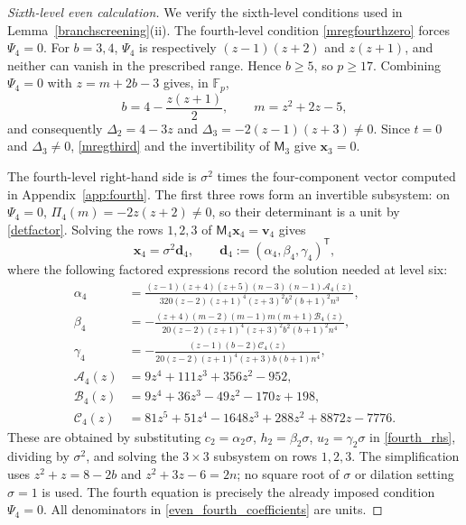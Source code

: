\documentclass[12pt]{article}
\theoremstyle{remark}
\newcommand{\F}{\mathbb{F}_p}
\begin{document}
\begin{proof}[Sixth-level even calculation]
We verify the sixth-level conditions used in
Lemma~\ref{branchscreening}(ii).  The fourth-level condition \eqref{mregfourthzero} forces $\Psi_4=0$.
For $b=3,4$, $\Psi_4$ is respectively $(z-1)(z+2)$ and $z(z+1)$,
and neither can vanish in the prescribed range.  Hence $b\ge5$,
so $p\ge17$.  Combining $\Psi_4=0$ with $z=m+2b-3$ gives, in $\F$,
\begin{equation}\label{q4curve}
 b=4-\frac{z(z+1)}2,\qquad m=z^2+2z-5,
\end{equation}
and consequently $\Delta_2=4-3z$ and
$\Delta_3=-2(z-1)(z+3)\ne0$.  Since $t=0$ and $\Delta_3\ne0$, \eqref{mregthird} and the invertibility
of $\mathsf M_3$ give $\mathbf x_3=0$.

The fourth-level right-hand side is $\sigma^2$ times the
four-component vector computed in Appendix~\ref{app:fourth}.  The first
three rows form an invertible subsystem: on $\Psi_4=0$,
$\Pi_4(m)=-2z(z+2)\ne0$, so their determinant is a unit by \eqref{detfactor}.
Solving the rows $1,2,3$ of $\mathsf M_4\mathbf x_4=\mathbf v_4$ gives
\begin{equation}\label{even_fourth_state}
 \mathbf x_4=\sigma^2\mathbf d_4,\qquad
 \mathbf d_4:=(\alpha_4,\beta_4,\gamma_4)^{\mathsf T},
\end{equation}
where the following factored expressions record the solution needed
at level six:
\begin{equation}\label{even_fourth_coefficients}
\begin{aligned}
 \alpha_4&=
 \frac{(z-1)(z+4)(z+5)(n-3)(n-1)\mathcal A_4(z)}
 {320(z-2)(z+1)^4(z+3)^2b^2(b+1)^2n^3},\\
 \beta_4&=-
 \frac{(z+4)(m-2)(m-1)m(m+1)\mathcal B_4(z)}
 {20(z-2)(z+1)^4(z+3)^2b^2(b+1)^2n^4},\\
 \gamma_4&=-
 \frac{(z-1)(b-2)\mathcal C_4(z)}
 {20(z-2)(z+1)^4(z+3)b(b+1)n^4},\\
 \mathcal A_4(z)&=9z^4+111z^3+356z^2-952,\\
 \mathcal B_4(z)&=9z^4+36z^3-49z^2-170z+198,\\
 \mathcal C_4(z)&=81z^5+51z^4-1648z^3+288z^2+8872z-7776.
\end{aligned}
\end{equation}
These are obtained by substituting
$c_2=\alpha_2\sigma$, $h_2=\beta_2\sigma$, $u_2=\gamma_2\sigma$
in \eqref{fourth_rhs}, dividing by $\sigma^2$, and solving the $3\times3$ subsystem on rows $1,2,3$.
The simplification uses $z^2+z=8-2b$ and $z^2+3z-6=2n$;
no square root of $\sigma$ or dilation setting $\sigma=1$ is used.
The fourth equation is precisely the already imposed condition $\Psi_4=0$.
All denominators in \eqref{even_fourth_coefficients} are units.


\end{proof}
\end{document}

